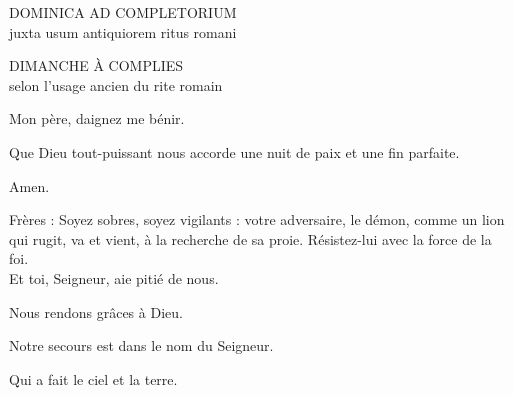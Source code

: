 \documentclass[twoside]{article}
\begin{document}
\null \newpage

\sloppy

\begin{paracol}[1]{2}

\begin{center}\begin{doublespace}

{
\MakeUppercase{\Large Dominica ad Completorium}\\
juxta usum antiquiorem ritus romani}
\end{doublespace}\end{center}

\switchcolumn

\begin{center}\begin{doublespace}
{
\MakeUppercase{\Large Dimanche à Complies}\\
selon l'usage ancien du rite romain
}
\end{doublespace}\end{center}

\switchcolumn*


\switchcolumn

\vv Mon père, daignez me bénir.

\vv Que Dieu tout-puissant nous accorde une nuit de paix et une fin parfaite.

\rr Amen.

\switchcolumn*


\switchcolumn

 \capsaut Frères : Soyez sobres, soyez vigilants : votre adversaire, le démon, comme un lion qui rugit, va et vient, à la recherche de sa proie. Résistez-lui avec la force de la foi. \\
Et toi, Seigneur, aie pitié de nous.

\rr Nous rendons grâces à Dieu.

\switchcolumn*


\switchcolumn

\vv Notre secours \cc est dans le nom du Seigneur.

\rr Qui a fait le ciel et la terre.

\switchcolumn*


\end{paracol}
\end{document}
